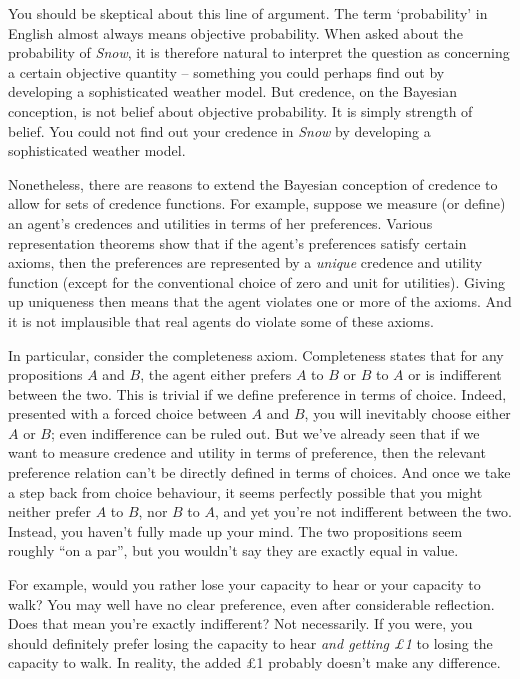 You should be skeptical about this line of argument. The term
`probability' in English almost always means objective
probability. When asked about the probability of \emph{Snow}, it is
therefore natural to interpret the question as concerning a certain
objective quantity -- something you could perhaps find out by
developing a sophisticated weather model. But credence, on the
Bayesian conception, is not belief about objective probability. It is
simply strength of belief. You could not find out your credence in
\emph{Snow} by developing a sophisticated weather model.

Nonetheless, there are reasons to extend the Bayesian conception of
credence to allow for sets of credence functions. For example, suppose
we measure (or define) an agent's credences and utilities in terms of
her preferences. Various representation theorems show that if the
agent's preferences satisfy certain axioms, then the preferences are
represented by a \emph{unique} credence and utility function (except
for the conventional choice of zero and unit for utilities). Giving up
uniqueness then means that the agent violates one or more of the
axioms. And it is not implausible that real agents do violate some of
these axioms.

In particular, consider the completeness axiom. Completeness states
that for any propositions $A$ and $B$, the agent either prefers $A$ to
$B$ or $B$ to $A$ or is indifferent between the two. This is trivial
if we define preference in terms of choice. Indeed, presented with a
forced choice between $A$ and $B$, you will inevitably choose either
$A$ or $B$; even indifference can be ruled out. But we've already seen
that if we want to measure credence and utility in terms of
preference, then the relevant preference relation can't be directly
defined in terms of choices. And once we take a step back from choice
behaviour, it seems perfectly possible that you might neither prefer
$A$ to $B$, nor $B$ to $A$, and yet you're not indifferent between the
two. Instead, you haven't fully made up your mind. The two
propositions seem roughly ``on a par'', but you wouldn't say they are
exactly equal in value.

For example, would you rather lose your capacity to hear or your
capacity to walk? You may well have no clear preference, even after
considerable reflection. Does that mean you're exactly indifferent?
Not necessarily. If you were, you should definitely prefer losing the
capacity to hear \emph{and getting £1} to losing the capacity to
walk. In reality, the added £1 probably doesn't make any difference.

